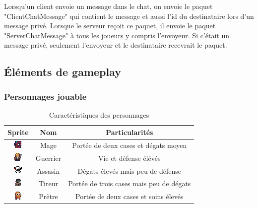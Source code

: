 \documentclass[a4paper, 12pt, twoside]{article}
\begin{document}
Lorsqu'un client envoie un message dans le chat, on envoie le paquet "ClientChatMessage" qui contient le message et aussi l'id du destinataire lors d'un message privé. Lorsque le serveur reçoit ce paquet, il envoie le paquet "ServerChatMessage" à tous les joueurs y compris l'envoyeur. Si c'était un message privé, seulement l'envoyeur et le destinataire recevrait le paquet.
\newpage
\subsection{Éléments de gameplay}
\subsubsection{Personnages jouable}
\begin{table}[H]
    \begin{center}
    \begin{tabular}{ | c | c | c | }
    	\hline
        Sprite & Nom & Particularités\\
        \hline
        
        \includegraphics[scale=2.2]{./Players/Magus} & Mage & Portée de deux cases et dégats moyen\\
        \hline
        
        \includegraphics[scale=1.9]{./Players/WarriorNew} & Guerrier & Vie et défense élévés\\
        \hline
        
        \includegraphics[scale=2.2]{./Players/Rogue} & Assasin & Dégats élevés mais peu de défense\\
        \hline
        
        \includegraphics[scale=2.2]{./Players/Ranger} & Tireur & Portée de trois cases mais peu de dégats\\
        \hline
        
        \includegraphics[scale=1.9]{./Players/Healer} & Prêtre & Portée de deux cases et soins élevés\\
    	\hline
    \end{tabular}
    \caption{Caractéristiques des personnages}
    \label{perso}
    \end{center}
\end{table}
\end{document}

